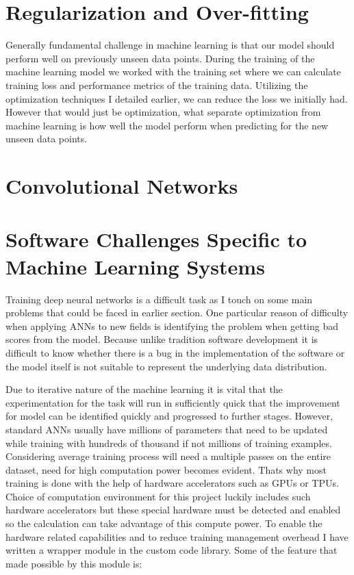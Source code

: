 \section{Regularization and Over-fitting} \label{sec:regularization}
Generally fundamental challenge in machine learning is that our model should perform well on previously unseen data points.
During the training of the machine learning model we worked with the training set where we can calculate training loss and performance metrics of the training data. 
Utilizing the optimization techniques I detailed earlier, we can reduce the loss we initially had. 
However that would just be optimization, what separate optimization from machine learning is how well the model perform when predicting for the new unseen data points. 


\section{Convolutional Networks} \label{sec:convnets}

\section{Software Challenges Specific to 
Machine Learning Systems} \label{sec:engchallenge}
Training deep neural networks is a difficult task as I touch on some main problems that could be faced in earlier section. 
One particular reason of difficulty when applying ANNs to new fields is identifying the problem when getting bad scores from the model. 
Because unlike tradition software development it is difficult to know whether there is a bug in the implementation of the software or the model itself is not suitable to represent the underlying data distribution.

Due to iterative nature of the machine learning it is vital that the experimentation for the task will run in sufficiently quick that the improvement for model can be identified quickly and progressed to further stages. 
However, standard ANNs usually have millions of parameters that need to be updated while training with hundreds of thousand if not millions of training examples. 
Considering average training process will need a multiple passes on the entire dataset, need for high computation power becomes evident.
Thats why most training is done with the help of hardware accelerators such as GPUs or TPUs.
Choice of computation environment for this project luckily includes such hardware accelerators but these special hardware must be detected and enabled so the calculation can take advantage of this compute power.
To enable the hardware related capabilities and to reduce training management overhead I have written a wrapper module in the custom code library.
Some of the feature that made possible by this module is:

